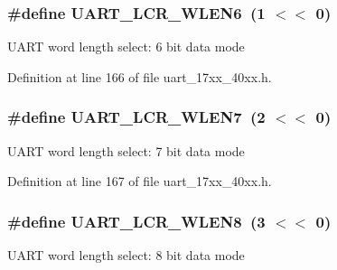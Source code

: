 \subsubsection[{\texorpdfstring{U\+A\+R\+T\+\_\+\+L\+C\+R\+\_\+\+W\+L\+E\+N6}{UART_LCR_WLEN6}}]{\setlength{\rightskip}{0pt plus 5cm}\#define U\+A\+R\+T\+\_\+\+L\+C\+R\+\_\+\+W\+L\+E\+N6~(1 $<$$<$ 0)}\hypertarget{group__UART__17XX__40XX_ga916fcefe6db8651be1cb1c066726381d}{}\label{group__UART__17XX__40XX_ga916fcefe6db8651be1cb1c066726381d}
U\+A\+RT word length select\+: 6 bit data mode 

Definition at line 166 of file uart\+\_\+17xx\+\_\+40xx.\+h.

\subsubsection[{\texorpdfstring{U\+A\+R\+T\+\_\+\+L\+C\+R\+\_\+\+W\+L\+E\+N7}{UART_LCR_WLEN7}}]{\setlength{\rightskip}{0pt plus 5cm}\#define U\+A\+R\+T\+\_\+\+L\+C\+R\+\_\+\+W\+L\+E\+N7~(2 $<$$<$ 0)}\hypertarget{group__UART__17XX__40XX_ga7746eb5a2aac4b9f86e97ee82e5e2a10}{}\label{group__UART__17XX__40XX_ga7746eb5a2aac4b9f86e97ee82e5e2a10}
U\+A\+RT word length select\+: 7 bit data mode 

Definition at line 167 of file uart\+\_\+17xx\+\_\+40xx.\+h.

\subsubsection[{\texorpdfstring{U\+A\+R\+T\+\_\+\+L\+C\+R\+\_\+\+W\+L\+E\+N8}{UART_LCR_WLEN8}}]{\setlength{\rightskip}{0pt plus 5cm}\#define U\+A\+R\+T\+\_\+\+L\+C\+R\+\_\+\+W\+L\+E\+N8~(3 $<$$<$ 0)}\hypertarget{group__UART__17XX__40XX_ga71ecde192fb0c9facb9ef9c6b77cc687}{}\label{group__UART__17XX__40XX_ga71ecde192fb0c9facb9ef9c6b77cc687}
U\+A\+RT word length select\+: 8 bit data mode 


